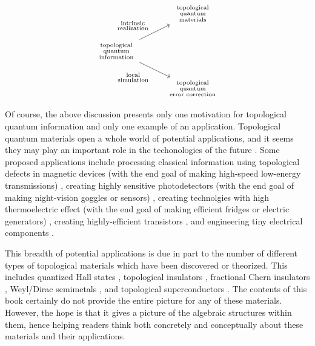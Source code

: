 \documentclass{article}
\theoremstyle{definition}
\numberwithin{figure}{section}
\begin{document}
\[\begin{tikzcd}
	& \begin{array}{c} \substack{\text{topological}\\ \text{quantum}\\\text{materials}} \end{array} \\
	\begin{array}{c} \substack{\text{topological} \\ \text{quantum} \\ \text{information}} \end{array} \\
	& \begin{array}{c} \substack{\text{topological}\\\text{quantum}\\ \text{error correction}} \end{array}
	\arrow["\begin{array}{c} \substack{\text{intrinsic}\\\text{realization}} \end{array}", from=2-1, to=1-2]
	\arrow["\begin{array}{c} \substack{\text{local}\\\text{simulation}} \end{array}"', from=2-1, to=3-2]
\end{tikzcd}\]

Of course, the above discussion presents only one motivation for topological quantum information and only one example of an application. Topological quantum materials open a whole world of potential applications, and it seems they may play an important role in the techonologies of the future \cite{ramirez2020dawn}. Some proposed applications include processing classical information using topological defects in magnetic devices (with the end goal of making high-speed low-energy transmissions) \cite{marrows2021perspective, vsmejkal2018topological}, creating highly sensitive photodetectors (with the end goal of making night-vision goggles or sensors) \cite{chan2017photocurrents}, creating technolgies with high thermoelectric effect (with the end goal of making efficient fridges or electric generators) \cite{skinner2018large}, creating highly-efficient transistors \cite{fuhrer2021proposal}, and engineering tiny electrical components \cite{viola2014hall, placke2017model}. 

This breadth of potential applications is due in part to the number of different types of topological materials which have been discovered or theorized. This includes quantized Hall states \cite{von202040}, topological insulators \cite{hasan2010colloquium}, fractional Chern insulators \cite{regnault2011fractional}, Weyl/Dirac semimetals \cite{armitage2018weyl}, and topological superconductors \cite{sato2017topological}. The contents of this book certainly do not provide the entire picture for any of these materials. However, the hope is that it gives a picture of the algebraic structures within them, hence helping readers think both concretely and conceptually about these materials and their applications.
\end{document}
